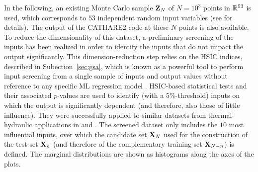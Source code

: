In the following, an existing Monte Carlo sample ${\bf Z}_N$ of $N=10^3$ points in $\mathbb{R}^{53}$ is used, which corresponds to $53$ independent random input variables (see \citealp{ioobou10} for details). 
The output of the CATHARE2 code at these $N$ points is also available. 
To reduce the dimensionality of this dataset, a preliminary screening of the inputs has been realized in order to identify the inputs that do not impact the output significantly. 
This dimension-reduction step relies on the HSIC indices, described in Subection~\ref{sec:gsa}, which is known as a powerful tool to perform input screening from a single sample of inputs and output values without reference to any specific ML regression model \citep{daveiga_2015}. 
HSIC-based statistical tests and their associated $p$-values are used to identify (with a $5\%$-threshold) inputs on which the output is significantly dependent (and therefore, also those of little influence). 
They were successfully applied to similar datasets from thermal-hydraulic applications in \citet{marrel_chabridon_2021} and \citet{marrel_iscream_2022}. 
The screened dataset only includes the $10$ most influential inputs, over which the candidate set ${\bf X}_N$ used for the construction of the test-set ${\bf X}_n$ (and therefore of the complementary training set ${\bf X}_{N-n}$) is defined. 
The marginal distributions are shown as histograms along the axes of the plots.

